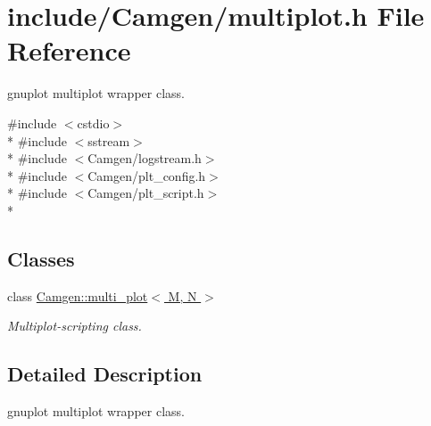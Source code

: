 \hypertarget{a00677}{\section{include/\-Camgen/multiplot.h File Reference}
\label{a00677}
}


gnuplot multiplot wrapper class.  


{\ttfamily \#include $<$cstdio$>$}\\*
{\ttfamily \#include $<$sstream$>$}\\*
{\ttfamily \#include $<$Camgen/logstream.\-h$>$}\\*
{\ttfamily \#include $<$Camgen/plt\-\_\-config.\-h$>$}\\*
{\ttfamily \#include $<$Camgen/plt\-\_\-script.\-h$>$}\\*
\subsection*{Classes}
\begin{DoxyCompactItemize}
\item 
class \hyperlink{a00376}{Camgen\-::multi\-\_\-plot$<$ M, N $>$}
\begin{DoxyCompactList}\small\item\em Multiplot-\/scripting class. \end{DoxyCompactList}\end{DoxyCompactItemize}


\subsection{Detailed Description}
gnuplot multiplot wrapper class. 